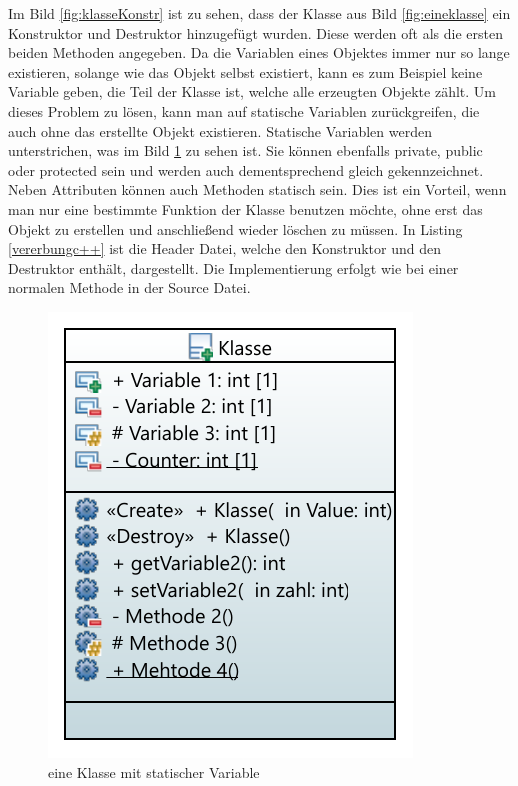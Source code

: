  Im Bild \ref{fig:klasseKonstr} ist zu sehen, dass der Klasse aus Bild \ref{fig:eineklasse} ein \glqq Konstruktor\grqq{} und \glqq Destruktor\grqq{} hinzugefügt wurden. Diese werden oft als die ersten beiden Methoden angegeben.
  Da die Variablen eines Objektes immer nur so lange existieren, solange wie das Objekt selbst existiert, kann es zum Beispiel keine Variable geben, die Teil der Klasse ist, welche alle erzeugten Objekte zählt. Um dieses Problem zu lösen, kann man auf statische Variablen  zurückgreifen, die auch ohne das erstellte Objekt existieren. Statische Variablen werden unterstrichen, was im Bild \ref{fig:klassestatic} zu sehen ist. Sie können ebenfalls   \glqq private\grqq{}, \glqq public\grqq{} oder  \glqq protected\grqq{} sein und werden auch dementsprechend gleich gekennzeichnet. Neben Attributen können auch Methoden statisch sein. Dies ist ein Vorteil, wenn man nur eine bestimmte Funktion der Klasse benutzen möchte, ohne erst das Objekt zu erstellen und anschließend wieder löschen zu müssen. In Listing \ref{vererbungc++} ist die Header Datei, welche den Konstruktor und den Destruktor enthält, dargestellt. Die Implementierung erfolgt wie bei einer normalen Methode in der Source Datei. 
  \begin{figure}[H]
 	\centering
 	 	\includegraphics[scale=1.2]{bilder/pdfvorlagen/model3}
 	\caption[eine Klasse mit statischer Variable]{eine Klasse mit statischer Variable}
 	\label{fig:klassestatic}
 \end{figure}
\cite{HelmutErlenkotter.}
\cite{Prof.Dr.AlfredIrber.}
\cite{Krau.}
